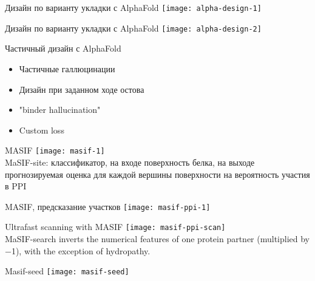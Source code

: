 \begin{frame}{Дизайн по варианту укладки с AlphaFold}
    \centering
                \texttt{[image: alpha-design-1]}  
\end{frame}

\begin{frame}{Дизайн по варианту укладки с AlphaFold}
    \centering
                \texttt{[image: alpha-design-2]}  
\end{frame}

\begin{frame}{Частичный дизайн  с AlphaFold}
    \large
    \begin{itemize}
        \item Частичные галлюцинации
        \item Дизайн при заданном ходе остова
        \item "binder hallucination"
        \item Custom loss
    \end{itemize}
\end{frame}

\begin{frame}{MASIF}
    \texttt{[image: masif-1]} \\
    MaSIF-site: классификатор, на входе  поверхность белка, на выходе  прогнозируемая оценка для каждой вершины поверхности на
вероятность участия в PPI
\end{frame}

\begin{frame}{MASIF, предсказание участков}
    \centering
    \texttt{[image: masif-ppi-1]}

\end{frame}

\begin{frame}{Ultrafast scanning with MASIF}
    \texttt{[image: masif-ppi-scan]}\\
    \footnotesize \*MaSIF-search inverts the numerical features of one  protein partner (multiplied by −1), with the exception of hydropathy. 
\end{frame}


\begin{frame}{Masif-seed}
    \centering
    \texttt{[image: masif-seed]}  
\end{frame}




